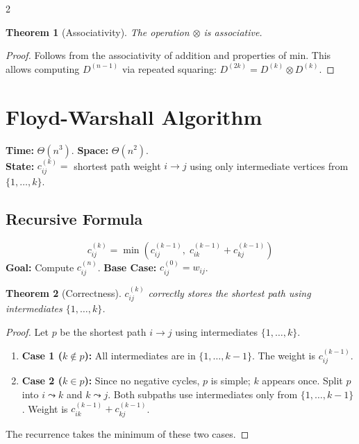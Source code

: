 \documentclass[10pt, a4paper]{article}
\newcommand{\ThetaO}[1]{\Theta(#1)}
\theoremstyle{compact}
\newtheorem*{theorem}{Theorem}
\begin{document}
\begin{multicols*}{2}
\begin{theorem}[Associativity]
The operation $\otimes$ is associative.
\end{theorem}
\begin{proof}
Follows from the associativity of addition and properties of min. This allows computing $D^{(n-1)}$ via repeated squaring: $D^{(2k)} = D^{(k)} \otimes D^{(k)}$.
\end{proof}

\section{Floyd-Warshall Algorithm}
\textbf{Time:} $\ThetaO{n^3}$. \textbf{Space:} $\ThetaO{n^2}$. \\
\textbf{State:} $c_{ij}^{(k)} =$ shortest path weight $i \to j$ using only intermediate vertices from $\{1, \dots, k\}$.

\subsection{Recursive Formula}
\[ c_{ij}^{(k)} = \min \left( c_{ij}^{(k-1)}, \; c_{ik}^{(k-1)} + c_{kj}^{(k-1)} \right) \]
\textbf{Goal:} Compute $c_{ij}^{(n)}$. \textbf{Base Case:} $c_{ij}^{(0)} = w_{ij}$.

\begin{theorem}[Correctness]
$c_{ij}^{(k)}$ correctly stores the shortest path using intermediates $\{1, \dots, k\}$.
\end{theorem}
\begin{proof}
Let $p$ be the shortest path $i \to j$ using intermediates $\{1, \dots, k\}$.
\begin{enumerate}
    \item \textbf{Case 1 ($k \notin p$):} All intermediates are in $\{1, \dots, k-1\}$. The weight is $c_{ij}^{(k-1)}$.
    \item \textbf{Case 2 ($k \in p$):} Since no negative cycles, $p$ is simple; $k$ appears once. Split $p$ into $i \leadsto k$ and $k \leadsto j$. Both subpaths use intermediates only from $\{1, \dots, k-1\}$. Weight is $c_{ik}^{(k-1)} + c_{kj}^{(k-1)}$.
\end{enumerate}
The recurrence takes the minimum of these two cases.
\end{proof}


\end{multicols*}
\end{document}
